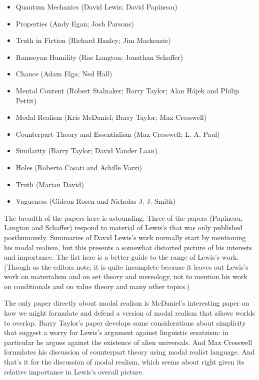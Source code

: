 \documentclass[
  10pt,
  letterpaper,
  DIV=11,
  numbers=noendperiod,
  twoside]{scrartcl}
\providecommand{\tightlist}{%
  \setlength{\itemsep}{0pt}\setlength{\parskip}{0pt}}\usepackage{longtable,booktabs,array}
\begin{document}
\begin{itemize}
\tightlist
\item
  Quantum Mechanics (David Lewis; David Papineau)
\item
  Properties (Andy Egan; Josh Parsons)
\item
  Truth in Fiction (Richard Hanley; Jim Mackenzie)
\item
  Ramseyan Humility (Rae Langton; Jonathan Schaffer)
\item
  Chance (Adam Elga; Ned Hall)
\item
  Mental Content (Robert Stalnaker; Barry Taylor; Alan Hájek and Philip
  Pettit)
\item
  Modal Realism (Kris McDaniel; Barry Taylor; Max Cresswell)
\item
  Counterpart Theory and Essentialism (Max Cresswell; L. A. Paul)
\item
  Similarity (Barry Taylor; David Vander Laan)
\item
  Holes (Roberto Casati and Achille Varzi)
\item
  Truth (Marian David)
\item
  Vagueness (Gideon Rosen and Nicholas J. J. Smith)
\end{itemize}

The breadth of the papers here is astounding. Three of the papers
(Papineau, Langton and Schaffer) respond to material of Lewis's that was
only published posthumously. Summaries of David Lewis's work normally
start by mentioning his modal realism, but this presents a somewhat
distorted picture of his interests and importance. The list here is a
better guide to the range of Lewis's work. (Though as the editors note,
it is quite incomplete because it leaves out Lewis's work on materialism
and on set theory and mereology, not to mention his work on conditionals
and on value theory and many other topics.)

The only paper directly about modal realism is McDaniel's interesting
paper on how we might formulate and defend a version of modal realism
that allows worlds to overlap. Barry Taylor's paper develops some
considerations about simplicity that suggest a worry for Lewis's
argument against linguistic ersatzism: in particular he argues against
the existence of alien universals. And Max Cresswell formulates his
discussion of counterpart theory using modal realist language. And
that's it for the discussion of modal realism, which seems about right
given its relative importance in Lewis's overall picture.
\end{document}
